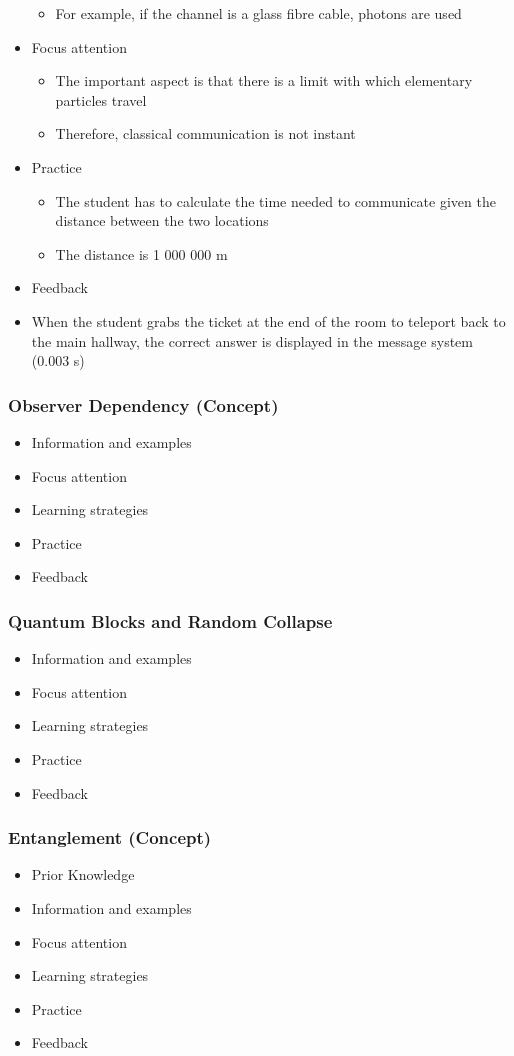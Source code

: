 \documentclass[11pt,twoside]{report} %
\begin{document}
\begin{itemize}
\begin{itemize}
			\item For example, if the channel is a glass fibre cable, photons are used
		\end{itemize}
		\item Focus attention
		\begin{itemize}
			\item The important aspect is that there is a limit with which elementary particles travel
			\item Therefore, classical communication is not instant
		\end{itemize}			
		\item Practice
		\begin{itemize}
			\item The student has to calculate the time needed to communicate given the distance between the two locations
			\item The distance is 1 000 000 m
		\end{itemize}
		\item Feedback
			\item When the student grabs the ticket at the end of the room to teleport back to the main hallway, the correct answer is displayed in the message system (0.003 s)
	\end{itemize}
\subsubsection{Observer Dependency (Concept)}
	\begin{itemize}
		\item Information and examples
		\item Focus attention
		\item Learning strategies
		\item Practice
		\item Feedback
	\end{itemize}
\subsubsection{Quantum Blocks and Random Collapse}
	\begin{itemize}
		\item Information and examples
		\item Focus attention
		\item Learning strategies
		\item Practice
		\item Feedback
	\end{itemize}
\subsubsection{Entanglement (Concept)}
	\begin{itemize}
		\item Prior Knowledge
		\item Information and examples
		\item Focus attention
		\item Learning strategies
		\item Practice
		\item Feedback
	\end{itemize}
\end{document}
